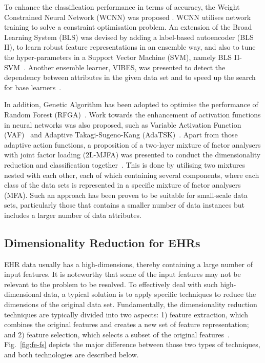 \documentclass{article}
\newcommand*{\1}{\textcolor{magenta}}
\begin{document}
	To enhance the classification performance in terms of accuracy, the Weight Constrained Neural Network (WCNN) was proposed \cite{livieris2019improving}. WCNN utilises network training to solve a constraint optimisation problem. An extension of the Broad Learning System (BLS) was devised by adding a label-based autoencoder (BLS II), to learn robust feature representations in an ensemble way, and also to tune the hyper-parameters in a Support Vector Machine (SVM), namely BLS II-SVM~\cite{tang2019construction}. Another ensemble learner, VIBES, was presented to detect the dependency between attributes in the given data set and to speed up the search for base learners~\cite{aydin2019construction}.
	
	In addition, Genetic Algorithm has been adopted to optimise the performance of Random Forest (RFGA)~\cite{elyan2017genetic}. Work towards the enhancement of activation functions in neural networks was also proposed, such as Variable Activation Function (VAF)~\cite{apicella2019simple} and Adaptive Takagi-Sugeno-Kang (AdaTSK)~\cite{8858838}. Apart from those adaptive action functions, a proposition of a two-layer mixture of factor analysers with joint factor loading (2L-MJFA) was presented to conduct the dimensionality reduction and classification together~\cite{yang2018new}. This is done by utilising two mixtures nested with each other, each of which containing several components, where each class of the data sets is represented in a specific mixture of factor analysers (MFA). Such an approach has been proven to be suitable for small-scale data sets, particularly those that contains a smaller number of data instances but includes a larger number of data attributes.
	
	\subsection{Dimensionality Reduction for EHRs}\label{sec:relatedworks}
	EHR data usually has a high-dimensions, thereby containing a large number of input features. It is noteworthy that some of the input features may not be relevant to the problem to be resolved. To effectively deal with such high-dimensional data, a typical solution is to apply specific techniques to reduce the dimensions of the original data set. Fundamentally, the dimensionality reduction techniques are typically divided into two aspects: 1) feature extraction, which combines the original features and creates a new set of feature representation; and 2) feature selection, which selects a subset of the original features~\cite{remeseiro2019review}. Fig.~\ref{fig:fe-fs} depicts the major difference between those two types of techniques, and both technologies are described below.  
	
\end{document}
